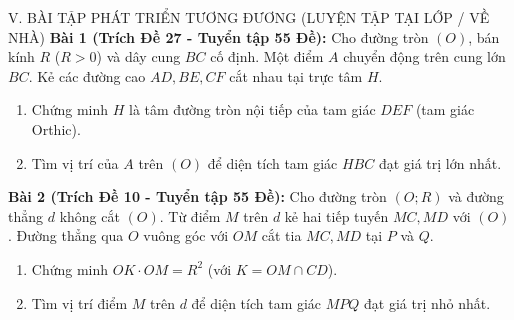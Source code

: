 \documentclass[11pt,a4paper]{article}
\begin{document}
\begin{exercisebox}{V. BÀI TẬP PHÁT TRIỂN TƯƠNG ĐƯƠNG (LUYỆN TẬP TẠI LỚP / VỀ NHÀ)}
\textbf{Bài 1 (Trích Đề 27 - Tuyển tập 55 Đề):} Cho đường tròn $(O)$, bán kính $R$ ($R>0$) và dây cung $BC$ cố định. Một điểm $A$ chuyển động trên cung lớn $BC$. Kẻ các đường cao $AD, BE, CF$ cắt nhau tại trực tâm $H$.
\begin{enumerate}[label=\alph*)]
    \item Chứng minh $H$ là tâm đường tròn nội tiếp của tam giác $DEF$ (tam giác Orthic).
    \item Tìm vị trí của $A$ trên $(O)$ để diện tích tam giác $HBC$ đạt giá trị lớn nhất.
\end{enumerate}

\vspace{1mm}
\textbf{Bài 2 (Trích Đề 10 - Tuyển tập 55 Đề):} Cho đường tròn $(O; R)$ và đường thẳng $d$ không cắt $(O)$. Từ điểm $M$ trên $d$ kẻ hai tiếp tuyến $MC, MD$ với $(O)$. Đường thẳng qua $O$ vuông góc với $OM$ cắt tia $MC, MD$ tại $P$ và $Q$.
\begin{enumerate}[label=\alph*)]
    \item Chứng minh $OK \cdot OM = R^2$ (với $K = OM \cap CD$).
    \item Tìm vị trí điểm $M$ trên $d$ để diện tích tam giác $MPQ$ đạt giá trị nhỏ nhất.
\end{enumerate}
\end{exercisebox}
\end{document}
